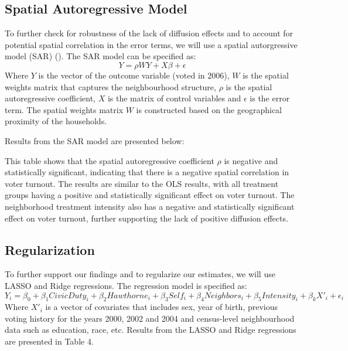 \documentclass[11pt]{article}
\begin{document}
\subsection{Spatial Autoregressive Model}
To further check for robustness of the lack of diffusion effects and to account for potential spatial correlation in the error terms, we will use a spatial autorgressive model (SAR) (\cite{lord_chapter_2021}). The SAR model can be specified as:
\begin{equation}
    Y = \rho W Y + X\beta + \epsilon
\end{equation}
Where $Y$ is the vector of the outcome variable (voted in 2006), $W$ is the spatial weights matrix that captures the neighbourhood structure, $\rho$ is the spatial autoregressive coefficient, $X$ is the matrix of control variables and $\epsilon$ is the error term. The spatial weights matrix $W$ is constructed based on the geographical proximity of the households.

Results from the SAR model are presented below:

\begin{table}[H]
    \begin{centering}
        
    \end{centering}
\end{table}

This table shows that the spatial autoregressive coefficient $\rho$ is negative and statistically significant, indicating that there is a negative spatial correlation in voter turnout. The results are similar to the OLS results, with all treatment groups having a positive and statistically significant effect on voter turnout. The neighborhood treatment intensity also has a negative and statistically significant effect on voter turnout, further supporting the lack of positive diffusion effects.

\subsection{Regularization}
To further support our findings and to regularize our estimates, we will use LASSO and Ridge regressions. The regression model is specified as:
\begin{equation}
    Y_i = \beta_0 + \beta_1 CivicDuty_i + \beta_2 Hawthorne_i + \beta_3 Self_i + \beta_4 Neighbors_i + \beta_5 Intensity_i + \beta_k X'_i + \epsilon_i
\end{equation}
Where $X'_i$ is a vector of covariates that includes sex, year of birth, previous voting history for the years 2000, 2002 and 2004 and census-level neighbourhood data such as education, race, etc. Results from the LASSO and Ridge regressions are presented in Table 4.
\end{document}
